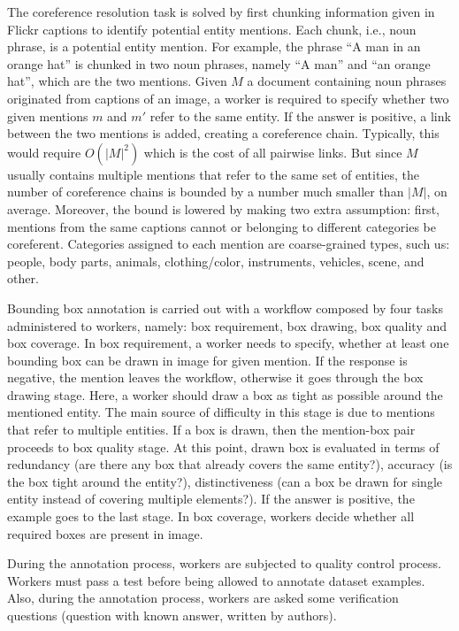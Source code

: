 The coreference resolution task is solved by first chunking
information given in Flickr captions to identify potential entity
mentions. Each chunk, i.e., noun phrase, is a potential entity
mention. For example, the phrase ``A man in an orange hat'' is chunked
in two noun phrases, namely ``A man'' and ``an orange hat'', which are
the two mentions. Given $M$ a document containing noun phrases
originated from captions of an image, a worker is required to specify
whether two given mentions $m$ and $m'$ refer to the same entity. If
the answer is positive, a link between the two mentions is added,
creating a coreference chain. Typically, this would require $O(|M|^2)$
which is the cost of all pairwise links. But since $M$ usually
contains multiple mentions that refer to the same set of entities, the
number of coreference chains is bounded by a number much smaller than
$|M|$, on average. Moreover, the bound is lowered by making two extra
assumption: first, mentions from the same captions cannot or belonging
to different categories be coreferent. Categories assigned to each
mention are coarse-grained types, such us: people, body parts,
animals, clothing/color, instruments, vehicles, scene, and other.

Bounding box annotation is carried out with a workflow composed by
four tasks administered to workers, namely: box requirement, box
drawing, box quality and box coverage. In box requirement, a worker
needs to specify, whether at least one bounding box can be drawn in
image for given mention. If the response is negative, the mention
leaves the workflow, otherwise it goes through the box drawing stage.
Here, a worker should draw a box as tight as possible around the
mentioned entity. The main source of difficulty in this stage is due
to mentions that refer to multiple entities. If a box is drawn, then
the mention-box pair proceeds to box quality stage. At this point,
drawn box is evaluated in terms of redundancy (are there any box that
already covers the same entity?), accuracy (is the box tight around
the entity?), distinctiveness (can a box be drawn for single entity
instead of covering multiple elements?). If the answer is positive,
the example goes to the last stage. In box coverage, workers decide
whether all required boxes are present in image. 

During the annotation process, workers are subjected to quality
control process. Workers must pass a test before being allowed to
annotate dataset examples. Also, during the annotation process,
workers are asked some verification questions (question with known
answer, written by authors).

